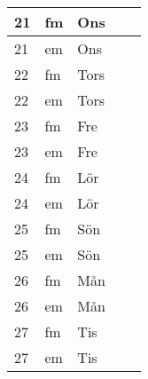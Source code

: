 \documentclass[a4paper]{article}
\begin{document}
\begin{table}[ht!]
\begin{tabular}{lllp{7cm}p{7cm}}
\multicolumn{1}{|l|}{21} & \multicolumn{1}{l|}{fm} & \multicolumn{1}{l|}{Ons} & \multicolumn{1}{l|}{} & \multicolumn{1}{l|}{} \\ \hline
\multicolumn{1}{|l|}{21} & \multicolumn{1}{l|}{em} & \multicolumn{1}{l|}{Ons} & \multicolumn{1}{l|}{} & \multicolumn{1}{l|}{} \\ \hline    

\multicolumn{1}{|l|}{22} & \multicolumn{1}{l|}{fm} & \multicolumn{1}{l|}{Tors} & \multicolumn{1}{l|}{} & \multicolumn{1}{l|}{} \\ \hline
\multicolumn{1}{|l|}{22} & \multicolumn{1}{l|}{em} & \multicolumn{1}{l|}{Tors} & \multicolumn{1}{l|}{} & \multicolumn{1}{l|}{} \\ \hline    

\multicolumn{1}{|l|}{23} & \multicolumn{1}{l|}{fm} & \multicolumn{1}{l|}{Fre} & \multicolumn{1}{l|}{} & \multicolumn{1}{l|}{} \\ \hline
\multicolumn{1}{|l|}{23} & \multicolumn{1}{l|}{em} & \multicolumn{1}{l|}{Fre} & \multicolumn{1}{l|}{} & \multicolumn{1}{l|}{} \\ \hline    

\multicolumn{1}{|l|}{24} & \multicolumn{1}{l|}{fm} & \multicolumn{1}{l|}{Lör} & \multicolumn{1}{l|}{} & \multicolumn{1}{l|}{} \\ \hline
\multicolumn{1}{|l|}{24} & \multicolumn{1}{l|}{em} & \multicolumn{1}{l|}{Lör} & \multicolumn{1}{l|}{} & \multicolumn{1}{l|}{} \\ \hline    

\multicolumn{1}{|l|}{25} & \multicolumn{1}{l|}{fm} & \multicolumn{1}{l|}{Sön} & \multicolumn{1}{l|}{} & \multicolumn{1}{l|}{} \\ \hline
\multicolumn{1}{|l|}{25} & \multicolumn{1}{l|}{em} & \multicolumn{1}{l|}{Sön} & \multicolumn{1}{l|}{} & \multicolumn{1}{l|}{} \\ \hline    

\multicolumn{1}{|l|}{26} & \multicolumn{1}{l|}{fm} & \multicolumn{1}{l|}{Mån} & \multicolumn{1}{l|}{} & \multicolumn{1}{l|}{} \\ \hline
\multicolumn{1}{|l|}{26} & \multicolumn{1}{l|}{em} & \multicolumn{1}{l|}{Mån} & \multicolumn{1}{l|}{} & \multicolumn{1}{l|}{} \\ \hline    

\multicolumn{1}{|l|}{27} & \multicolumn{1}{l|}{fm} & \multicolumn{1}{l|}{Tis} & \multicolumn{1}{l|}{} & \multicolumn{1}{l|}{} \\ \hline
\multicolumn{1}{|l|}{27} & \multicolumn{1}{l|}{em} & \multicolumn{1}{l|}{Tis} & \multicolumn{1}{l|}{} & \multicolumn{1}{l|}{} \\ \hline    


\end{tabular}
\end{table}
\end{document}
